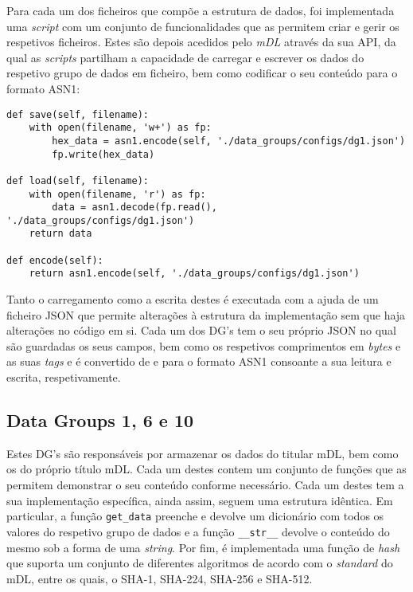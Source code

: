 
Para cada um dos ficheiros que compõe a estrutura de dados, foi implementada uma \textit{script} com um conjunto de funcionalidades que as permitem criar e gerir os respetivos ficheiros. Estes são depois acedidos pelo \textit{mDL} através da sua API, da qual as \textit{scripts} partilham a capacidade de carregar e escrever os dados do respetivo grupo de dados em ficheiro, bem como codificar o seu conteúdo	para o formato ASN1:

\begin{verbatim}
def save(self, filename):
    with open(filename, 'w+') as fp:
        hex_data = asn1.encode(self, './data_groups/configs/dg1.json')
        fp.write(hex_data)

def load(self, filename):
    with open(filename, 'r') as fp:
        data = asn1.decode(fp.read(), './data_groups/configs/dg1.json')
    return data

def encode(self):
    return asn1.encode(self, './data_groups/configs/dg1.json')
\end{verbatim}

Tanto o carregamento como a escrita destes é executada com a ajuda de um ficheiro JSON que permite alterações à estrutura da implementação sem que haja alterações no código em si. Cada um dos DG's tem o seu próprio JSON no qual são guardadas os seus campos, bem como os respetivos comprimentos em \textit{bytes} e as suas \textit{tags} e é convertido de e para o formato ASN1 consoante a sua leitura e escrita, respetivamente.

\subsection{Data Groups 1, 6 e 10}

Estes DG's são responsáveis por armazenar os dados do titular mDL, bem como os do próprio título mDL. Cada um destes contem um conjunto de funções que as permitem demonstrar o seu conteúdo conforme necessário. Cada um destes tem a sua implementação específica, ainda assim, seguem uma estrutura idêntica. Em particular, a função \texttt{get\_data} preenche e devolve um dicionário com todos os valores do respetivo grupo de dados e a função \texttt{\_\_str\_\_} devolve o conteúdo do mesmo sob a forma de uma \textit{string}. Por fim, é implementada uma função de \textit{hash} que suporta um conjunto de diferentes algoritmos de acordo com o \textit{standard} do mDL, entre os quais, o SHA-1, SHA-224, SHA-256 e SHA-512.


